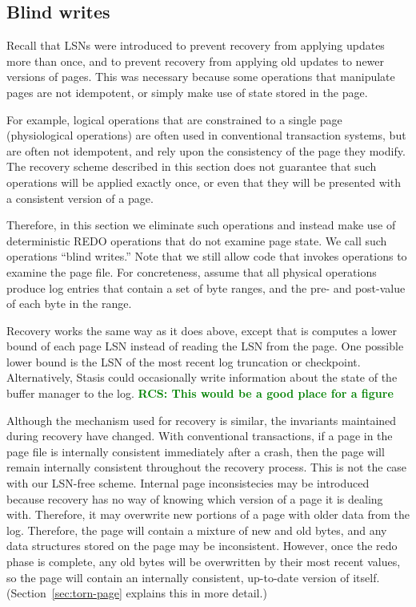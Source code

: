 \documentclass[letterpaper,twocolumn,10pt]{article}
\newcommand{\yad}{Stasis\xspace}
\newcommand{\rcs}[1]{\textcolor{green}{\bf RCS: #1}}
\begin{document}
\subsection{Blind writes}
Recall that LSNs were introduced to prevent recovery from applying
updates more than once, and to prevent recovery from applying old
updates to newer versions of pages.  This was necessary because some
operations that manipulate pages are not idempotent, or simply make
use of state stored in the page.  

For example, logical operations that are constrained to a single page
(physiological operations) are often used in conventional transaction
systems, but are often not idempotent, and rely upon the consistency
of the page they modify.  The recovery scheme described in this
section does not guarantee that such operations will be applied
exactly once, or even that they will be presented with a consistent
version of a page.

Therefore, in this section we eliminate such operations and instead
make use of deterministic REDO operations that do not examine page
state.  We call such operations ``blind writes.''  Note that we still
allow code that invokes operations to examine the page file.  For concreteness,
assume that all physical operations produce log entries that contain a
set of byte ranges, and the pre- and post-value of each byte in the
range.  

Recovery works the same way as it does above, except that is computes
a lower bound of each page LSN instead of reading the LSN from the
page.  One possible lower bound is the LSN of the most recent log
truncation or checkpoint.  Alternatively, \yad could occasionally
write information about the state of the buffer manager to the log. \rcs{This would be a good place for a figure}

Although the mechanism used for recovery is similar, the invariants
maintained during recovery have changed.  With conventional
transactions, if a page in the page file is internally consistent
immediately after a crash, then the page will remain internally
consistent throughout the recovery process.  This is not the case with
our LSN-free scheme.  Internal page inconsistecies may be introduced
because recovery has no way of knowing which version of a page it is
dealing with.  Therefore, it may overwrite new portions of a page with
older data from the log.
Therefore, the page will contain a mixture of new and old bytes, and
any data structures stored on the page may be inconsistent.  However,
once the redo phase is complete, any old bytes will be overwritten by
their most recent values, so the page will contain an internally
consistent, up-to-date version of itself.
(Section~\ref{sec:torn-page} explains this in more detail.)
\end{document}
